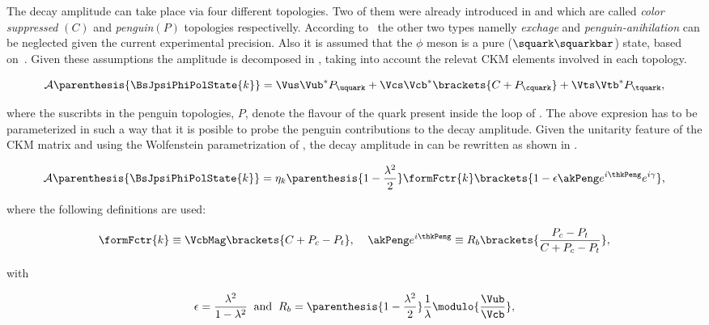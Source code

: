 The \BsJpsiPhi decay amplitude can take place via four different topologies.
Two of them were already introduced in  and  which are called {\it color suppressed }$(C)$ and {\it penguin}$(P)$
topologies respectivelly. According to~\cite{DeBruyn-thesis} the other two types namelly {\it exchage} and {\it penguin-anihilation} can be neglected
given the current experimental precision. Also it is assumed that the $\phi$ meson is a pure ($\squark\squarkbar$) state, based on~\cite{Faller:2008gt}.
Given these assumptions the \BsJpsiPhi amplitude is decomposed in , taking into account the relevat CKM elements involved in each topology.

\begin{equation}
\mathcal{A} \parenthesis{\BsJpsiPhiPolState{k}} = \Vus\Vub^*P_{\uquark} + \Vcs\Vcb^*\brackets{C +P_{\cquark}} + \Vts\Vtb^*P_{\tquark},
 \label{bsjpsiphi_amp}
\end{equation}

\noindent where the suscribts in the penguin topologies, $P$, denote the flavour of the quark present inside the loop of .
The above expresion has to be parameterized in such a way that it is posible to probe the penguin contributions to
the \BsJpsiPhi decay amplitude. Given the unitarity feature of the CKM matrix and using the Wolfenstein parametrization
of , the decay amplitude in  can be rewritten as shown in .

\begin{equation}
  \mathcal{A} \parenthesis{\BsJpsiPhiPolState{k}} = \eta_k  \parenthesis{1-\frac{\lambda^2}{2}} \formFctr{k} \brackets{ 1 - \epsilon \akPeng e^{i\thkPeng} e^{i\gamma} },
 \label{bsjpsiphi_amp_param}
\end{equation}

\noindent where the following definitions are used:

\begin{equation}
  \formFctr{k} \equiv \VcbMag \brackets{C + P_c - P_t}, \;\;\;\; \akPeng e^{i\thkPeng} \equiv R_b \brackets{ \frac{P_c - P_t}{C + P_c - P_t} },
  \label{bsjpsiphi_amp_param_defs}
\end{equation}

\noindent with

\begin{equation}
  \epsilon = \frac{\lambda^2}{1-\lambda^2} \;\;\text{and} \;\;  R_b = \parenthesis{1-\frac{\lambda^2}{2}} \frac{1}{\lambda} \modulo{\frac{\Vub}{\Vcb}},
  \label{bsjpsiphi_amp_param_defs_II}
\end{equation}

